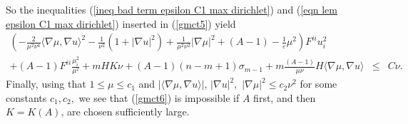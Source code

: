 \documentclass[10pt,reqno,oneside]{amsart}
\theoremstyle{definition}
\theoremstyle{remark}
\begin{document}
So the inequalities (\ref{ineq bad term epsilon C1 max dirichlet}) and (\ref{eqn lem epsilon C1 max dirichlet}) inserted in (\ref{gmct5}) yield
\begin{eqnarray}
\left(-\frac{2}{\mu^2\nu^4}\langle\nabla\mu,\nabla u\rangle^2-\frac{1}{\nu^2}(1+|\nabla u|^2)+\frac{1}{\mu^2\nu^2}|\nabla \mu|^2+ (A-1)-\frac{1}{\varepsilon}\mu^2\right)F^{ii}u_i^2&&\label{gmct6}\\
+(A-1)F^{ii}\frac{\mu_i^2}{\mu^2}+mHK\nu+(A-1)(n-m+1)\sigma_{m-1}+m\frac{(A-1)}{\mu\nu}H\langle\nabla\mu,\nabla u\rangle&\leq&C\nu.\nonumber
\end{eqnarray}
Finally, using that $1\leq \mu\leq c_1$ and $\left|\langle\nabla\mu,\nabla u\rangle\right|$, $|\nabla u|^2,$ $|\nabla \mu|^2\leq c_2\nu^2$ for some constants $c_1,c_2,$ we see that (\ref{gmct6}) is impossible if $A$ first, and then $K=K(A)$, are chosen sufficiently large.
\end{document}
